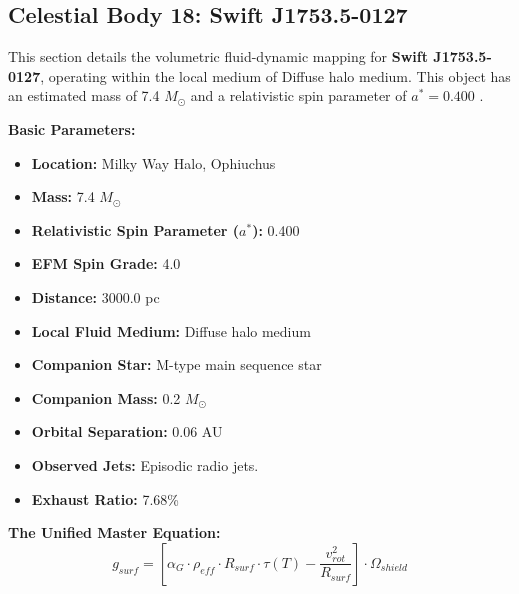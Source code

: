 \documentclass[11pt, a4paper]{article}
\begin{document}
\clearpage
\subsection{Celestial Body 18: Swift J1753.5-0127}
This section details the volumetric fluid-dynamic mapping for \textbf{Swift J1753.5-0127}, operating within the local medium of Diffuse halo medium. This object has an estimated mass of 7.4 $M_{\odot}$ and a relativistic spin parameter of $a^* = 0.400$ \cite{shaw2016, simbad}.

\vspace{0.5em}
\noindent \textbf{Basic Parameters:}
\begin{itemize}
  \item \textbf{Location:} Milky Way Halo, Ophiuchus
  \item \textbf{Mass:} 7.4 $M_{\odot}$
  \item \textbf{Relativistic Spin Parameter ($a^*$):} 0.400
  \item \textbf{EFM Spin Grade:} 4.0
  \item \textbf{Distance:} 3000.0 pc
  \item \textbf{Local Fluid Medium:} Diffuse halo medium
  \item \textbf{Companion Star:} M-type main sequence star
  \item \textbf{Companion Mass:} 0.2 $M_{\odot}$
  \item \textbf{Orbital Separation:} 0.06 AU
  \item \textbf{Observed Jets:} Episodic radio jets.
  \item \textbf{Exhaust Ratio:} 7.68\%
\end{itemize}

\vspace{0.5em}
\noindent \textbf{The Unified Master Equation:}
$$ g_{surf} = \left[ \alpha_G \cdot \rho_{eff} \cdot R_{surf} \cdot \tau(T) - \frac{v_{rot}^2}{R_{surf}} \right] \cdot \Omega_{shield} $$
\end{document}
